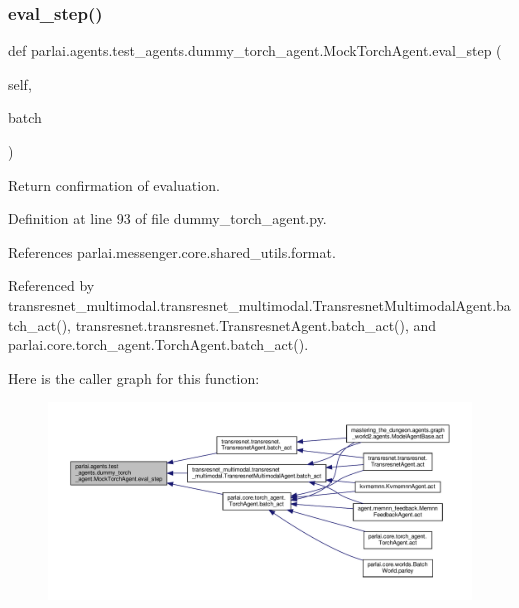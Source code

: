 \subsubsection{\texorpdfstring{eval\+\_\+step()}{eval\_step()}}
{\footnotesize\ttfamily def parlai.\+agents.\+test\+\_\+agents.\+dummy\+\_\+torch\+\_\+agent.\+Mock\+Torch\+Agent.\+eval\+\_\+step (\begin{DoxyParamCaption}\item[{}]{self,  }\item[{}]{batch }\end{DoxyParamCaption})}

\begin{DoxyVerb}Return confirmation of evaluation.\end{DoxyVerb}
 

Definition at line 93 of file dummy\+\_\+torch\+\_\+agent.\+py.



References parlai.\+messenger.\+core.\+shared\+\_\+utils.\+format.



Referenced by transresnet\+\_\+multimodal.\+transresnet\+\_\+multimodal.\+Transresnet\+Multimodal\+Agent.\+batch\+\_\+act(), transresnet.\+transresnet.\+Transresnet\+Agent.\+batch\+\_\+act(), and parlai.\+core.\+torch\+\_\+agent.\+Torch\+Agent.\+batch\+\_\+act().

Here is the caller graph for this function\+:
\nopagebreak
\begin{figure}[H]
\begin{center}
\leavevmode
\includegraphics[width=350pt]{classparlai_1_1agents_1_1test__agents_1_1dummy__torch__agent_1_1MockTorchAgent_aea8dfe6e44a419f31e741c4770a82f9b_icgraph}
\end{center}
\end{figure}
\mbox{\label{classparlai_1_1agents_1_1test__agents_1_1dummy__torch__agent_1_1MockTorchAgent_a867115faed3455518fb1f9a0ab41f761}} 

